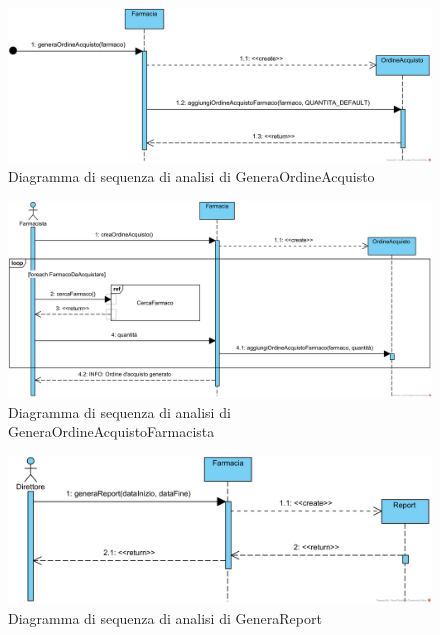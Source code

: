 \begin{figure}[h]
    \centering
	\includegraphics[width=\linewidth]{assets/sequence_analisi/SequenceAnalisiGeneraOrdineAcquisto.png}
    \caption{Diagramma di sequenza di analisi di GeneraOrdineAcquisto}
\end{figure}

\begin{figure}[h]
    \centering
	\includegraphics[width=\linewidth]{assets/sequence_analisi/SequenceAnalisiGeneraOrdineAcquistoFarmacista.png}
    \caption{Diagramma di sequenza di analisi di GeneraOrdineAcquistoFarmacista}
\end{figure}

\begin{figure}[h]
    \centering
	\includegraphics[width=\linewidth]{assets/sequence_analisi/SequenceAnalisiGeneraReport.png}
    \caption{Diagramma di sequenza di analisi di GeneraReport}
\end{figure}

